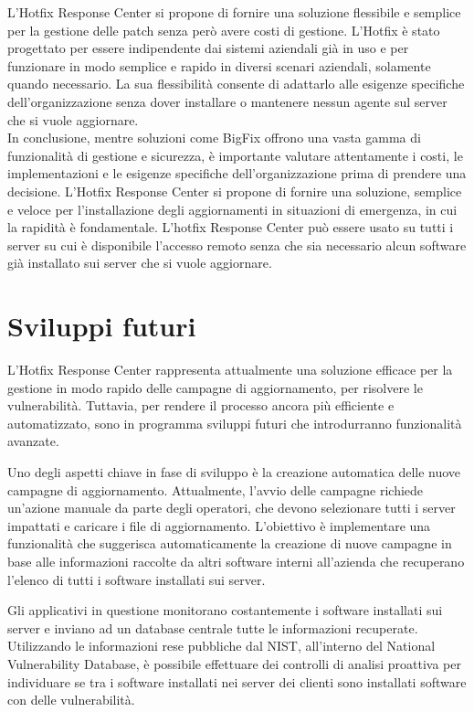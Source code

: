 L'Hotfix Response Center si propone di fornire una soluzione flessibile e semplice 
per la gestione delle patch senza però avere costi di gestione. L’Hotfix è stato 
progettato per essere indipendente dai sistemi aziendali già in uso e per funzionare 
in modo semplice e rapido in diversi scenari aziendali, solamente quando necessario. 
La sua flessibilità consente di adattarlo alle esigenze specifiche dell'organizzazione 
senza dover installare o mantenere nessun agente sul server che si vuole aggiornare.\\

In conclusione, mentre soluzioni come BigFix offrono una vasta gamma di funzionalità di 
gestione e sicurezza, è importante valutare attentamente i costi, le implementazioni e 
le esigenze specifiche dell'organizzazione prima di prendere una decisione. 
L'Hotfix Response Center si propone di fornire una soluzione, semplice e veloce per 
l’installazione degli aggiornamenti in situazioni di emergenza, in cui la rapidità è 
fondamentale. 
L’hotfix Response Center può essere usato su tutti i server su cui è 
disponibile l’accesso remoto senza che sia necessario alcun software già installato 
sui server che si vuole aggiornare.

\section{Sviluppi futuri}
L’Hotfix Response Center rappresenta attualmente una soluzione efficace per la gestione in 
modo rapido delle campagne di aggiornamento, per risolvere le vulnerabilità. Tuttavia, per 
rendere il processo ancora più efficiente e automatizzato, sono in programma sviluppi futuri 
che introdurranno funzionalità avanzate.

Uno degli aspetti chiave in fase di sviluppo è la creazione automatica delle nuove campagne 
di aggiornamento. 
Attualmente, l'avvio delle campagne richiede un'azione manuale da parte degli operatori, che 
devono selezionare tutti i server impattati e caricare i file di aggiornamento. L'obiettivo 
è implementare una funzionalità che suggerisca automaticamente la creazione di nuove campagne 
in base alle informazioni raccolte da altri software interni all’azienda che recuperano 
l’elenco di tutti i software installati sui server.

Gli applicativi in questione monitorano costantemente i software installati sui server e 
inviano ad un database centrale tutte le informazioni recuperate.
Utilizzando le informazioni rese pubbliche dal NIST, all’interno del National Vulnerability 
Database, è possibile effettuare dei controlli di analisi proattiva per individuare se tra i 
software installati nei server dei clienti sono installati software con delle vulnerabilità.


